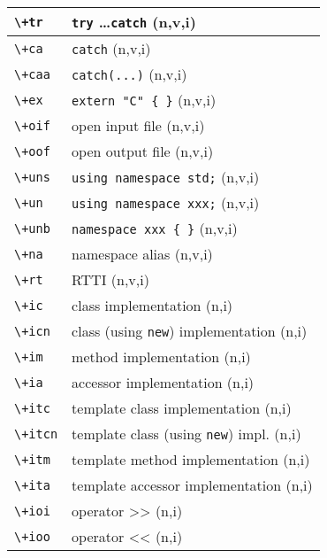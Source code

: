 \documentclass[oneside,11pt,landscape,DIV16]{scrartcl}
\begin{document}
\begin{multicols}{3}
\begin{center}
\begin{tabular}[]{|p{12mm}|p{60mm}|}
\hline
\hline \verb'\+tr'  & \verb'try' \dots \verb'catch'        \hfill (n,v,i)\\
\hline \verb'\+ca'  & \verb'catch'                         \hfill (n,v,i)\\
\hline \verb'\+caa' & \verb'catch(...)'                    \hfill (n,v,i)\\
\hline
\hline \verb'\+ex'  & \verb'extern "C" { }'                \hfill (n,v,i)\\
\hline \verb'\+oif' & open input file                      \hfill (n,v,i)\\
\hline \verb'\+oof' & open output file                     \hfill (n,v,i)\\
\hline \verb'\+uns' & \verb'using namespace std;'          \hfill (n,v,i)\\
\hline \verb'\+un'  & \verb'using namespace xxx;'          \hfill (n,v,i)\\
\hline \verb'\+unb' & \verb'namespace xxx { }'             \hfill (n,v,i)\\
\hline \verb'\+na'  & namespace alias                      \hfill (n,v,i)\\
\hline \verb'\+rt'  & RTTI                                 \hfill (n,v,i)\\
%
\hline
\hline \verb'\+ic'  & class  implementation                   \hfill (n,i)\\
\hline \verb'\+icn' & class (using \verb'new') implementation \hfill (n,i)\\
\hline \verb'\+im'  & method implementation                   \hfill (n,i)\\
\hline \verb'\+ia'  & accessor implementation                 \hfill (n,i)\\
\hline \verb'\+itc' & template class  implementation          \hfill (n,i)\\
\hline \verb'\+itcn'& template class (using \verb'new') impl. \hfill (n,i)\\
\hline \verb'\+itm' & template method implementation          \hfill (n,i)\\
\hline \verb'\+ita' & template accessor implementation        \hfill (n,i)\\
\hline \verb'\+ioi' & operator >>                             \hfill (n,i)\\
\hline \verb'\+ioo' & operator <<                             \hfill (n,i)\\
\hline 
\end{tabular}
%

\end{center}
\end{multicols}
\end{document}
